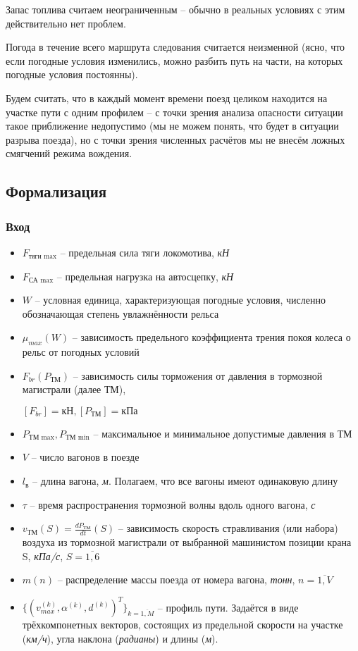 Запас топлива считаем неограниченным -- обычно в реальных условиях с этим действительно нет проблем.

Погода в течение всего маршрута следования считается неизменной (ясно, что если погодные условия изменились, можно разбить путь на части, на которых погодные условия постоянны).

Будем считать, что в каждый момент времени поезд целиком находится на участке пути с одним профилем -- с точки зрения анализа опасности ситуации такое приближение недопустимо (мы не можем понять, что будет в ситуации разрыва поезда), но с точки зрения численных расчётов мы не внесём ложных смягчений режима вождения.

\subsection{Формализация}
\subsubsection{Вход}
\begin{itemize}
\item $F_{\text{тяги max}}$ -- предельная сила тяги локомотива, \textit{кН}
\item $F_{\text{СА max}}$ -- предельная нагрузка на автосцепку, \textit{кН}
\item $W$ -- условная единица, характеризующая погодные условия, численно обозначающая степень увлажнённости рельса
\item $\mu_{max}(W)$ -- зависимость предельного коэффициента трения покоя колеса о рельс от погодных условий
\item $F_{br}(P_{\text{ТМ}})$ -- зависимость силы торможения от давления в тормозной магистрали (далее ТМ),

$[F_{br}]=\text{кН}, [P_{\text{ТМ}}]=\text{кПа}$
\item $P_{\text{ТМ max}}, P_{\text{ТМ min}}$ -- максимальное и минимальное допустимые давления в ТМ
\item $V$ -- число вагонов в поезде
\item $l_{\text{в}}$ -- длина вагона, \textit{м}. Полагаем, что все вагоны имеют одинаковую длину
\item $\tau$ -- время распространения тормозной волны вдоль одного вагона,  \textit{с}
\item $v_{\text{ТМ}}(S)=\frac{dP_{ТМ}}{dt}(S)$ -- зависимость скорость стравливания (или набора) воздуха из тормозной магистрали от выбранной машинистом позиции крана S, \textit{кПа/с}, $S=\overline{1,6}$
\item $m(n)$ -- распределение массы поезда от номера вагона, \textit{тонн}, $n=\overline{1, V}$
\item
$\{(v_{max}^{(k)}, \alpha^{(k)}, d^{(k)})^{T}\}_{k=\overline{1, M}}$ -- профиль пути. Задаётся в виде трёхкомпонетных векторов, состоящих из предельной скорости на участке (\textit{км/ч}), угла наклона (\textit{радианы}) и длины (\textit{м}).

\end{itemize}

